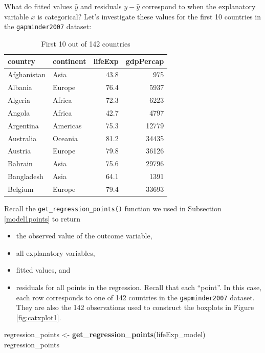 \documentclass[12pt,]{krantz}
\makeatletter
\newenvironment{Shaded}{\begin{snugshade}}{\end{snugshade}}
\newcommand{\KeywordTok}[1]{\textcolor[rgb]{0.27,0.27,0.27}{\textbf{#1}}}
\newcommand{\StringTok}[1]{\textcolor[rgb]{0.5,0.5,0.5}{#1}}
\newcommand{\NormalTok}[1]{#1}
\providecommand{\tightlist}{%
  \setlength{\itemsep}{0pt}\setlength{\parskip}{0pt}}
\newenvironment{kframe}{%
\medskip{}
\setlength{\fboxsep}{.8em}
 \def\at@end@of@kframe{}%
 \ifinner\ifhmode%
  \def\at@end@of@kframe{\end{minipage}}%
  \begin{minipage}{\columnwidth}%
 \fi\fi%
 \def\FrameCommand##1{\hskip\@totalleftmargin \hskip-\fboxsep
 \colorbox{shadecolor}{##1}\hskip-\fboxsep
     \hskip-\linewidth \hskip-\@totalleftmargin \hskip\columnwidth}%
 \MakeFramed {\advance\hsize-\width
   \@totalleftmargin\z@ \linewidth\hsize
   \@setminipage}}%
 {\par\unskip\endMakeFramed%
 \at@end@of@kframe}
\renewenvironment{Shaded}{\begin{kframe}}{\end{kframe}}
\theoremstyle{definition}
\theoremstyle{definition}
\theoremstyle{definition}
\theoremstyle{remark}
\makeatother
\begin{document}
What do fitted values \(\widehat{y}\) and residuals \(y - \widehat{y}\)
correspond to when the explanatory variable \(x\) is categorical? Let's
investigate these values for the first 10 countries in the
\texttt{gapminder2007} dataset:

\begin{table}[H]

\caption{\label{tab:unnamed-chunk-201}First 10 out of 142 countries}
\centering
\fontsize{10}{12}\selectfont
\begin{tabular}[t]{llrr}
\toprule
country & continent & lifeExp & gdpPercap\\
\midrule
Afghanistan & Asia & 43.8 & 975\\
Albania & Europe & 76.4 & 5937\\
Algeria & Africa & 72.3 & 6223\\
Angola & Africa & 42.7 & 4797\\
Argentina & Americas & 75.3 & 12779\\
\addlinespace
Australia & Oceania & 81.2 & 34435\\
Austria & Europe & 79.8 & 36126\\
Bahrain & Asia & 75.6 & 29796\\
Bangladesh & Asia & 64.1 & 1391\\
Belgium & Europe & 79.4 & 33693\\
\bottomrule
\end{tabular}
\end{table}

Recall the \texttt{get\_regression\_points()} function we used in
Subsection \ref{model1points} to return

\begin{itemize}
\tightlist
\item
  the observed value of the outcome variable,
\item
  all explanatory variables,
\item
  fitted values, and
\item
  residuals for all points in the regression. Recall that each
  ``point''. In this case, each row corresponds to one of 142 countries
  in the \texttt{gapminder2007} dataset. They are also the 142
  observations used to construct the boxplots in Figure
  \ref{fig:catxplot1}.
\end{itemize}

\begin{Shaded}
\begin{Highlighting}[]
\NormalTok{regression_points <-}\StringTok{ }\KeywordTok{get_regression_points}\NormalTok{(lifeExp_model)}
\NormalTok{regression_points}
\end{Highlighting}
\end{Shaded}
\end{document}
